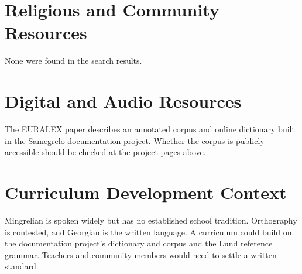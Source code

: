 \documentclass[12pt]{article}
\begin{document}
\section{Religious and Community Resources}
None were found in the search results.

\section{Digital and Audio Resources}
The EURALEX paper describes an annotated corpus and online dictionary built in the Samegrelo documentation project. Whether the corpus is publicly accessible should be checked at the project pages above.

\section{Curriculum Development Context}
Mingrelian is spoken widely but has no established school tradition. Orthography is contested, and Georgian is the written language. A curriculum could build on the documentation project's dictionary and corpus and the Lund reference grammar. Teachers and community members would need to settle a written standard.
\end{document}
